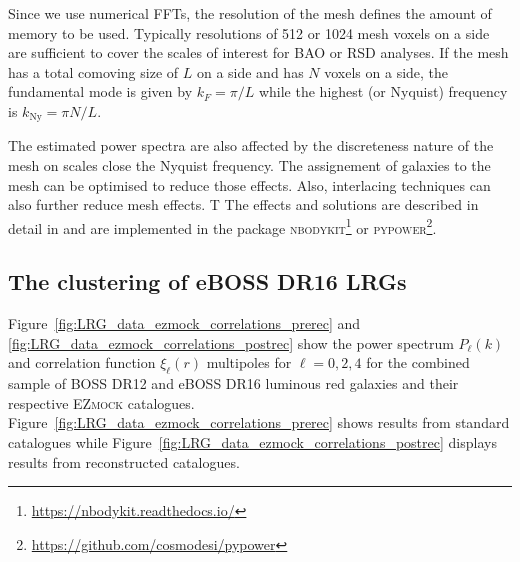 Since we use numerical FFTs, the resolution of the mesh defines the amount of memory to be used. 
Typically resolutions of 512 or 1024 mesh voxels on a side are sufficient to cover the scales of interest 
for BAO or RSD analyses. If the mesh has a total comoving size of $L$ on a side and has $N$ voxels on a side, 
the fundamental mode is given by $k_F = \pi/L$ while the highest (or Nyquist) frequency is $k_\text{Ny} = \pi N/L$. 

The estimated power spectra are also affected by the discreteness nature of the mesh on scales close 
the Nyquist frequency. The assignement of galaxies to the mesh can be optimised to reduce those effects. 
Also, interlacing techniques can also further reduce mesh effects. T
The effects and solutions are described in detail in \cite{sefusattiAccurateEstimatorsCorrelation2016}
and are implemented in the package \textsc{nbodykit}\footnote{\url{https://nbodykit.readthedocs.io/}}
or \textsc{pypower}\footnote{\url{https://github.com/cosmodesi/pypower}}. 

\subsection{The clustering of eBOSS DR16 LRGs}
\label{galaxies:clustering:eboss_dr16_lrgs}

Figure~\ref{fig:LRG_data_ezmock_correlations_prerec} and \ref{fig:LRG_data_ezmock_correlations_postrec}
show the power spectrum $P_\ell(k)$ and correlation function $\xi_\ell(r)$ multipoles for $\ell = 0, 2, 4$
for the combined sample of BOSS DR12 and eBOSS DR16 luminous red galaxies and their respective \textsc{EZmock}
catalogues. Figure~\ref{fig:LRG_data_ezmock_correlations_prerec} shows results from standard catalogues while 
Figure~\ref{fig:LRG_data_ezmock_correlations_postrec} displays results from reconstructed catalogues. 

